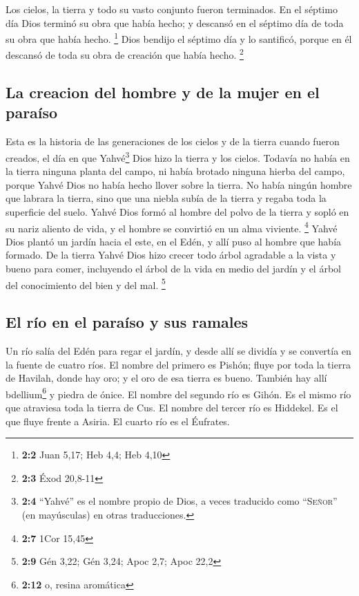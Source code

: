  Los cielos, la tierra y todo su vasto conjunto fueron
terminados.  En el séptimo día Dios terminó su obra que
había hecho; y descansó en el séptimo día de toda su obra que había
hecho. \footnote{\textbf{2:2} Juan 5,17; Heb 4,4; Heb 4,10}
 Dios bendijo el séptimo día y lo santificó, porque en él
descansó de toda su obra de creación que había hecho. \footnote{\textbf{2:3}
  Éxod 20,8-11}

\hypertarget{la-creacion-del-hombre-y-de-la-mujer-en-el-parauxedso}{%
\subsection{La creacion del hombre y de la mujer en el
paraíso}\label{la-creacion-del-hombre-y-de-la-mujer-en-el-parauxedso}}

 Esta es la historia de las generaciones de los cielos y
de la tierra cuando fueron creados, el día en que Yahvé\footnote{\textbf{2:4}
  ``Yahvé'' es el nombre propio de Dios, a veces traducido como
  ``\textsc{Señor}'' (en mayúsculas) en otras traducciones.} Dios hizo
la tierra y los cielos.  Todavía no había en la tierra
ninguna planta del campo, ni había brotado ninguna hierba del campo,
porque Yahvé Dios no había hecho llover sobre la tierra. No había ningún
hombre que labrara la tierra,  sino que una niebla subía
de la tierra y regaba toda la superficie del suelo.  Yahvé
Dios formó al hombre del polvo de la tierra y sopló en su nariz aliento
de vida, y el hombre se convirtió en un alma viviente. \footnote{\textbf{2:7}
  1Cor 15,45}  Yahvé Dios plantó un jardín hacia el este,
en el Edén, y allí puso al hombre que había formado.  De
la tierra Yahvé Dios hizo crecer todo árbol agradable a la vista y bueno
para comer, incluyendo el árbol de la vida en medio del jardín y el
árbol del conocimiento del bien y del mal. \footnote{\textbf{2:9} Gén
  3,22; Gén 3,24; Apoc 2,7; Apoc 22,2}

\hypertarget{el-ruxedo-en-el-parauxedso-y-sus-ramales}{%
\subsection{El río en el paraíso y sus
ramales}\label{el-ruxedo-en-el-parauxedso-y-sus-ramales}}

 Un río salía del Edén para regar el jardín, y desde allí
se dividía y se convertía en la fuente de cuatro ríos. 
El nombre del primero es Pishón; fluye por toda la tierra de Havilah,
donde hay oro;  y el oro de esa tierra es bueno. También
hay allí bdellium\footnote{\textbf{2:12} o, resina aromática} y piedra
de ónice.  El nombre del segundo río es Gihón. Es el
mismo río que atraviesa toda la tierra de Cus.  El nombre
del tercer río es Hiddekel. Es el que fluye frente a Asiria. El cuarto
río es el Éufrates.


